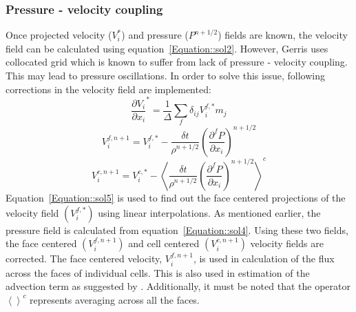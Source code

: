 \subsubsection{Pressure - velocity coupling}
Once projected velocity ($V_i^*$) and pressure ($P^{n+1/2}$) fields are known, the velocity field can be calculated using equation~\ref{Equation::sol2}. However, Gerris uses collocated grid which is known to suffer from lack of pressure - velocity coupling. This may lead to pressure oscillations. In order to solve this issue, following corrections in the velocity field are implemented:
\begin{equation}\label{Equation::sol5}
\frac{\partial V_i}{\partial x_i}^* = \frac{1}{\Delta}\sum_f\delta_{ij}V_i^{f,*}m_j
\end{equation}
\begin{equation}\label{Equation::sol6}
V_i^{f,n+1} = V_i^{f,*} - \frac{\delta t}{\rho^{n+1/2}}\left(\frac{\partial^f P}{\partial x_i}\right)^{n+1/2}
\end{equation}
\begin{equation}\label{Equation::sol7}
V_i^{c,n+1} = V_i^{c,*} - \left\langle\frac{\delta t}{\rho^{n+1/2}}\left(\frac{\partial^f P}{\partial x_i}\right)^{n+1/2}\right\rangle^c
\end{equation}
Equation~\ref{Equation::sol5} is used to find out the face centered projections of the velocity field $\left(V_i^{f,*}\right)$ using linear interpolations. As mentioned earlier, the pressure field is calculated from equation~\ref{Equation::sol4}. Using these two fields, the face centered $\left(V_i^{f,n+1}\right)$ and cell centered $\left(V_i^{c,n+1}\right)$ velocity fields are corrected. The face centered velocity, $V_i^{f,n+1}$, is used in calculation of the flux across the faces of individual cells. This is also used in estimation of the advection term as suggested by \citet{bell1989second}. Additionally, it must be noted that the operator $\left\langle\right\rangle^c$ represents averaging across all the faces. 

